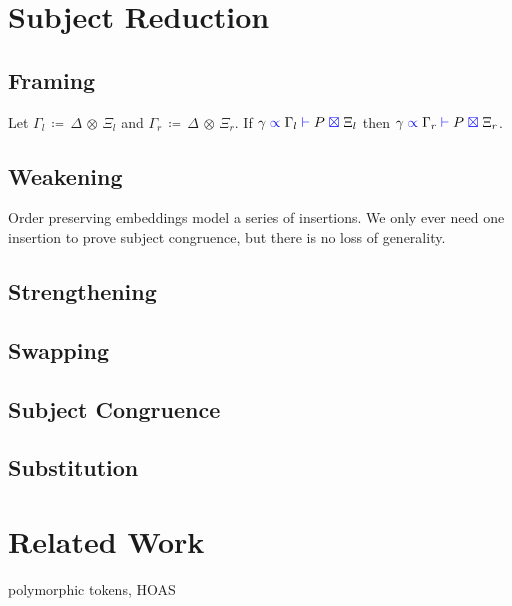 \documentclass[a4paper,UKenglish,cleveref, autoref, thm-restate,authorcolumns]{lipics-v2019}
\theoremstyle{definition}
\newcommand{\type}[1]{\textcolor{blue}{\operatorname{#1}}}
\newcommand{\opctx}[3]{#1 \, \coloneqq \, #2 \, \otimes \, #3}
\newcommand{\types}[4]{#1 \; \type{\propto} \; #2 \; \type{\vdash} \; #3 \; \type{\boxtimes} \; #4}
\begin{document}
\section{Subject Reduction}
\label{subject-reduction}

\subsection{Framing}

\begin{theorem}
  Let $\opctx{\Gamma_l}{\Delta}{\Xi_l}$ and $\opctx{\Gamma_r}{\Delta}{\Xi_r}$.
  If $\types{\gamma}{\Gamma_l}{P}{\Xi_l}$ then $\types{\gamma}{\Gamma_r}{P}{\Xi_r}$.
\end{theorem}

\subsection{Weakening}

Order preserving embeddings model a series of insertions. We only ever need one insertion to prove subject congruence, but there is no loss of generality.

\subsection{Strengthening}

\subsection{Swapping}

\subsection{Subject Congruence}
\label{subject-congruence}

\subsection{Substitution}

\section{Related Work}

\cite{previous-work} polymorphic tokens, HOAS
\end{document}

